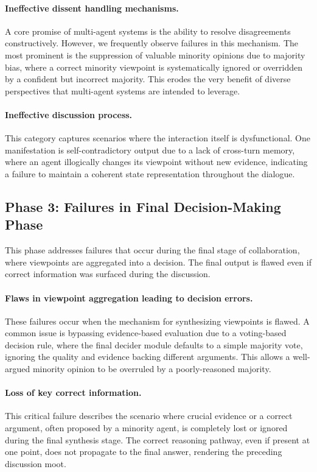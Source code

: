 \paragraph{Ineffective dissent handling mechanisms.}
A core promise of multi-agent systems is the ability to resolve disagreements constructively. However, we frequently observe failures in this mechanism. The most prominent is the suppression of valuable minority opinions due to majority bias, where a correct minority viewpoint is systematically ignored or overridden by a confident but incorrect majority. This erodes the very benefit of diverse perspectives that multi-agent systems are intended to leverage.

\paragraph{Ineffective discussion process.}
This category captures scenarios where the interaction itself is dysfunctional. One manifestation is self-contradictory output due to a lack of cross-turn memory, where an agent illogically changes its viewpoint without new evidence, indicating a failure to maintain a coherent state representation throughout the dialogue.

\subsection{Phase 3: Failures in Final Decision-Making Phase}
This phase addresses failures that occur during the final stage of collaboration, where viewpoints are aggregated into a decision. The final output is flawed even if correct information was surfaced during the discussion.

\paragraph{Flaws in viewpoint aggregation leading to decision errors.}
These failures occur when the mechanism for synthesizing viewpoints is flawed. A common issue is bypassing evidence-based evaluation due to a voting-based decision rule, where the final decider module defaults to a simple majority vote, ignoring the quality and evidence backing different arguments. This allows a well-argued minority opinion to be overruled by a poorly-reasoned majority.

\paragraph{Loss of key correct information.}
This critical failure describes the scenario where crucial evidence or a correct argument, often proposed by a minority agent, is completely lost or ignored during the final synthesis stage. The correct reasoning pathway, even if present at one point, does not propagate to the final answer, rendering the preceding discussion moot.

